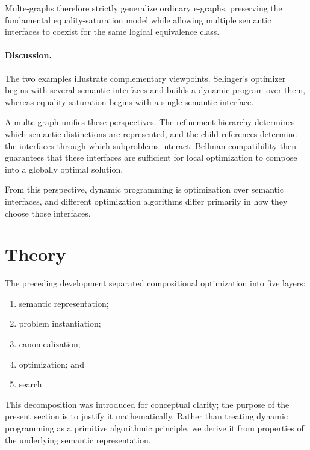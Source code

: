 \documentclass[sigconf,nonacm]{acmart}
\theoremstyle{definition}
\theoremstyle{plain}
\theoremstyle{remark}
\begin{document}
Multe-graphs therefore strictly generalize ordinary e-graphs,
preserving the fundamental equality-saturation model while allowing
multiple semantic interfaces to coexist for the same logical
equivalence class.

\paragraph{Discussion.}

The two examples illustrate complementary viewpoints.  Selinger's
optimizer begins with several semantic interfaces and builds a dynamic
program over them, whereas equality saturation begins with a single
semantic interface.

A multe-graph unifies these perspectives.  The refinement hierarchy
determines which semantic distinctions are represented, and the child
references determine the interfaces through which subproblems interact.
Bellman compatibility then guarantees that these interfaces are
sufficient for local optimization to compose into a globally optimal
solution.

From this perspective, dynamic programming is optimization over
semantic interfaces, and different optimization algorithms differ
primarily in how they choose those interfaces.

\section{Theory}
\label{sec:theory}

The preceding development separated compositional optimization into
five layers:

\begin{enumerate}

\item
semantic representation;

\item
problem instantiation;

\item
canonicalization;

\item
optimization; and

\item
search.

\end{enumerate}

This decomposition was introduced for conceptual clarity; the purpose
of the present section is to justify it mathematically.  Rather than
treating dynamic programming as a primitive algorithmic principle, we
derive it from properties of the underlying semantic representation.
\end{document}
